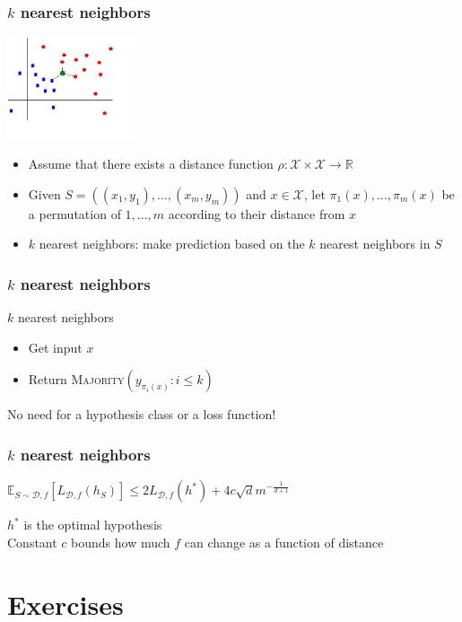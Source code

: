\documentclass[10pt]{beamer}
\begin{document}
\begin{frame}
  \frametitle{$k$ nearest neighbors}
  \begin{center}
	\includegraphics[height=3cm]{images/knn.png}
  \end{center}
  \begin{itemize}
  \item Assume that there exists a {\color{blue} distance function} $\rho:\mathcal{X}\times\mathcal{X}\rightarrow\mathbb{R}$
  \item Given $S=((x_1,y_1),\ldots,(x_m,y_m))$ and $x\in\mathcal{X}$, let $\pi_1(x),\ldots,\pi_m(x)$ be a {\color{red} permutation} of $1,\ldots,m$ according to their distance from $x$
  \item $k$ nearest neighbors: make prediction based on the $k$ nearest neighbors in $S$
  \end{itemize}
\end{frame}

\begin{frame}
  \frametitle{$k$ nearest neighbors}
  \begin{block}{$k$ nearest neighbors}
	\begin{itemize}
	\item Get input $x$
	\item Return \textsc{Majority}$(y_{\pi_i(x)}:i\leq k)$
	\end{itemize}
  \end{block}
  No need for a hypothesis class or a loss function!
\end{frame}

\begin{frame}
  \frametitle{$k$ nearest neighbors}
  \begin{theorem}
	$\mathbb{E}_{S\sim\mathcal{D},f} [L_{\mathcal{D},f}(h_S)] \leq 2 L_{\mathcal{D},f}(h^*) + 4c\sqrt{d}m^{-\frac 1 {d+1}}$
  \end{theorem}
  $h^*$ is the {\color{orange} optimal} hypothesis\\
  Constant $c$ bounds how much $f$ can {\color{blue} change} as a function of distance
\end{frame}

\section{Exercises}
\end{document}
